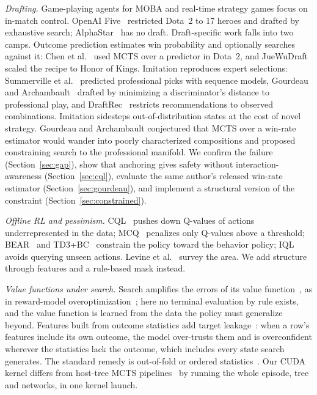 \documentclass[journal]{IEEEtran}
\begin{document}
\textit{Drafting.} Game-playing agents for MOBA and real-time strategy games focus on in-match control. OpenAI Five~\cite{berner2019dota} restricted Dota~2 to 17 heroes and drafted by exhaustive search; AlphaStar~\cite{vinyals2019grandmaster} has no draft. Draft-specific work falls into two camps. Outcome prediction estimates win probability and optionally searches against it: Chen et al.~\cite{chen2018drafting} used MCTS over a predictor in Dota~2, and JueWuDraft~\cite{chen2021juewudraft} scaled the recipe to Honor of Kings. Imitation reproduces expert selections: Summerville et al.~\cite{summerville2016draft} predicted professional picks with sequence models, Gourdeau and Archambault~\cite{gourdeau2021discriminative} drafted by minimizing a discriminator's distance to professional play, and DraftRec~\cite{lee2022draftrec} restricts recommendations to observed combinations. Imitation sidesteps out-of-distribution states at the cost of novel strategy. Gourdeau and Archambault conjectured that MCTS over a win-rate estimator would wander into poorly characterized compositions and proposed constraining search to the professional manifold. We confirm the failure (Section~\ref{sec:gap}), show that anchoring gives safety without interaction-awareness (Section~\ref{sec:cql}), evaluate the same author's released win-rate estimator (Section~\ref{sec:gourdeau}), and implement a structural version of the constraint (Section~\ref{sec:constrained}).

\textit{Offline RL and pessimism.} CQL~\cite{kumar2020conservative} pushes down Q-values of actions underrepresented in the data; MCQ~\cite{lyu2022mildly} penalizes only Q-values above a threshold; BEAR~\cite{kumar2019stabilizing} and TD3+BC~\cite{fujimoto2021minimalist} constrain the policy toward the behavior policy; IQL~\cite{kostrikov2022iql} avoids querying unseen actions. Levine et al.~\cite{levine2020offline} survey the area. We add structure through features and a rule-based mask instead.

\textit{Value functions under search.} Search amplifies the errors of its value function~\cite{silver2016mastering,silver2018general}, as in reward-model overoptimization~\cite{gao2023scaling}; here no terminal evaluation by rule exists, and the value function is learned from the data the policy must generalize beyond. Features built from outcome statistics add target leakage~\cite{kaufman2012leakage}: when a row's features include its own outcome, the model over-trusts them and is overconfident wherever the statistics lack the outcome, which includes every state search generates. The standard remedy is out-of-fold or ordered statistics~\cite{prokhorenkova2018catboost}. Our CUDA kernel differs from host-tree MCTS pipelines~\cite{chaslot2008parallel,wu2019accelerating} by running the whole episode, tree and networks, in one kernel launch.
\end{document}
